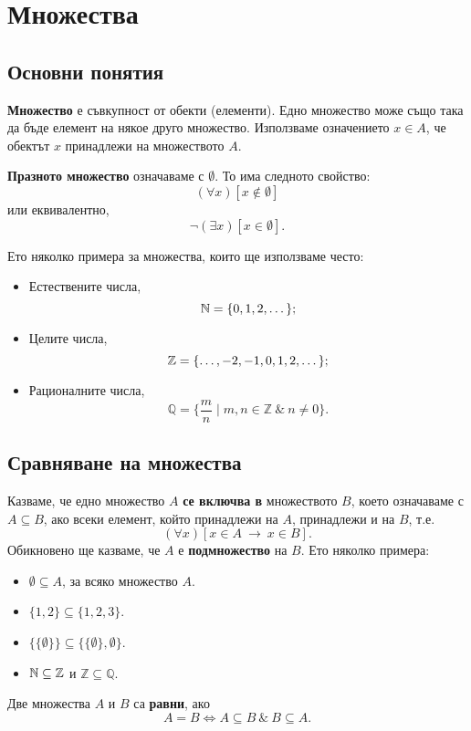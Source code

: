 \chapter{Множества}

\section{Основни понятия}
{\bf Множество} е съвкупност от обекти (елементи).
Едно множество може също така да бъде елемент на някое друго множество.
Използваме означението $x \in A$, 
че обектът $x$ принадлежи на множеството $A$.

{\bf Празното множество} означаваме с $\emptyset$.
То има следното свойство:
\[(\forall x)[x \not \in \emptyset]\]
или еквивалентно,
\[\neg (\exists x)[x \in \emptyset].\]

\begin{example}
  Ето няколко примера за множества, които ще използваме често:
  \begin{itemize}
  \item 
    Естествените числа, 
    \[\mathbb{N} = \{0,1,2,\dots\};\]
  \item
    Целите числа,
    \[\mathbb{Z} = \{\dots,-2,-1,0,1,2,\dots\};\]
  \item
    Рационалните числа,
    \[\mathbb{Q} = \{\frac{m}{n} \mid m,n \in \mathbb{Z}\ \&\ n \neq 0\}.\]
  \end{itemize}
\end{example}

\section{Сравняване на множества}

Казваме, че едно множество $A$ {\bf се включва в} множеството $B$, което означаваме с $A \subseteq B$, 
ако всеки елемент, който принадлежи на $A$, принадлежи и на $B$, т.е.
\[(\forall x)[x \in A\ \rightarrow\ x \in B].\]
Обикновено ще казваме, че $A$ е {\bf подмножество} на $B$.
Ето няколко примера:
\begin{itemize}
\item 
  $\emptyset \subseteq A$, за всяко множество $A$.
\item
  $\{1,2\} \subseteq \{1,2,3\}$.
\item
  $\{\{\emptyset\}\} \subseteq \{\{\emptyset\},\emptyset\}$.
\item
  $\mathbb{N} \subseteq \mathbb{Z}$ и $\mathbb{Z} \subseteq \mathbb{Q}$.
\end{itemize}
Две множества $A$ и $B$ са {\bf равни}, ако
\[A = B \iff A \subseteq B\ \&\ B\subseteq A.\]

